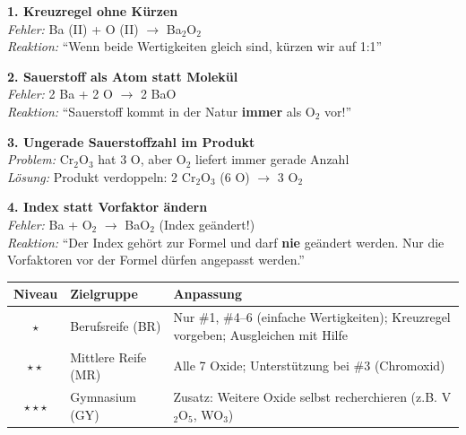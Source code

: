 \documentclass[11pt, a4paper]{article}
\newcommand{\abschnitt}[1]{%
    \vspace{10pt}%
    \noindent{\large\bfseries\textcolor{fachfarbe}{#1}}%
    \vspace{6pt}%
    \nopagebreak[4]%
}
\begin{document}
\begin{warnbox}
\textbf{1. Kreuzregel ohne Kürzen}\\
\textit{Fehler:} Ba (II) + O (II) $\rightarrow$ Ba$_2$O$_2$\\
\textit{Reaktion:} ``Wenn beide Wertigkeiten gleich sind, kürzen wir auf 1:1''

\vspace{6pt}

\textbf{2. Sauerstoff als Atom statt Molekül}\\
\textit{Fehler:} 2 Ba + 2 O $\rightarrow$ 2 BaO\\
\textit{Reaktion:} ``Sauerstoff kommt in der Natur \textbf{immer} als O$_2$ vor!''

\vspace{6pt}

\textbf{3. Ungerade Sauerstoffzahl im Produkt}\\
\textit{Problem:} Cr$_2$O$_3$ hat 3 O, aber O$_2$ liefert immer gerade Anzahl\\
\textit{Lösung:} Produkt verdoppeln: 2 Cr$_2$O$_3$ (6 O) $\rightarrow$ 3 O$_2$

\vspace{6pt}

\textbf{4. Index statt Vorfaktor ändern}\\
\textit{Fehler:} Ba + O$_2$ $\rightarrow$ BaO$_2$ (Index geändert!)\\
\textit{Reaktion:} ``Der Index gehört zur Formel und darf \textbf{nie} geändert werden. Nur die Vorfaktoren vor der Formel dürfen angepasst werden.''
\end{warnbox}


\abschnitt{Differenzierung}

\begin{tabular}{|c|L{4cm}|L{8.5cm}|}
\hline
\textbf{Niveau} & \textbf{Zielgruppe} & \textbf{Anpassung} \\
\hline
$\star$ & Berufsreife (BR) & Nur \#1, \#4--6 (einfache Wertigkeiten); Kreuzregel vorgeben; Ausgleichen mit Hilfe \\
\hline
$\star\star$ & Mittlere Reife (MR) & Alle 7 Oxide; Unterstützung bei \#3 (Chromoxid) \\
\hline
$\star\star\star$ & Gymnasium (GY) & Zusatz: Weitere Oxide selbst recherchieren (z.B. V$_2$O$_5$, WO$_3$) \\
\hline
\end{tabular}
\end{document}
